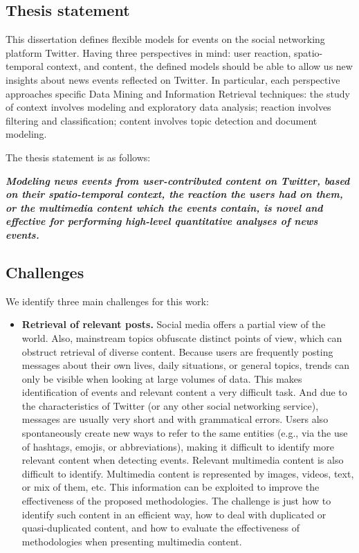 \begin{intro}

\subsection*{Thesis statement} 
%
This dissertation defines flexible models for events on the social
networking platform Twitter. 
%
Having three perspectives in mind: user reaction, spatio-temporal context, and
content, the defined models should be able to allow us new insights
about news events reflected on Twitter. 
%
In particular, each perspective approaches specific Data Mining and Information
Retrieval techniques: 
%
the study of context involves modeling and exploratory data analysis; 
%
reaction involves filtering and classification;
%
content involves topic detection and document modeling.

The thesis statement is as follows:

{\bf \em
Modeling news events from user-contributed content on Twitter, based on
their spatio-temporal context, the reaction the users had on them, or the
multimedia content which the events contain, is novel and effective for performing
high-level quantitative analyses of news events.
}




\subsection*{Challenges} 

We identify three main challenges for this work:

\begin{itemize}
    \item {\bf Retrieval of relevant posts.} 
    Social media offers a partial view of the world. 
    Also, mainstream topics obfuscate distinct points of view, which can
    obstruct retrieval of diverse content. 
    Because users are frequently posting messages about their own lives, daily
    situations, or general topics, trends can only be visible when looking at large
    volumes of data. 
    This makes identification of events and relevant content a very difficult task.
    And due to the characteristics of Twitter (or any other social networking
    service), messages are usually very short and with grammatical errors. 
    Users also spontaneously create new ways to refer to the same entities
    (e.g., via the use of hashtags, emojis, or abbreviations), making it
    difficult to identify more relevant content when detecting events.
    Relevant multimedia content is also difficult to identify. 
    Multimedia content is represented by images, videos, text, or mix of them,
    etc. 
    This information can be exploited to improve the effectiveness of
    the proposed methodologies. 
    The challenge is just how to identify such content in an efficient way, how
    to deal with duplicated or quasi-duplicated content, and how to evaluate the
    effectiveness of methodologies when presenting multimedia content. 


\end{itemize}
\end{intro}

